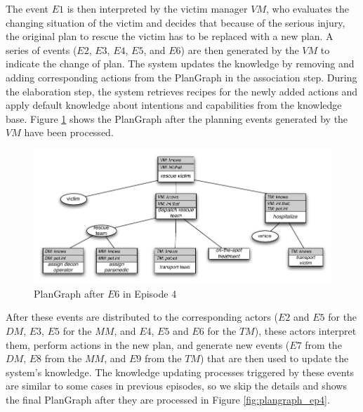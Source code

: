 The event $E1$ is then interpreted by the victim manager $VM$, who evaluates the changing situation of the victim and decides that because of the serious injury, the original plan to rescue the victim has to be replaced with a new plan. A series of events ($E2$, $E3$, $E4$, $E5$, and $E6$) are then generated by the $VM$ to indicate the change of plan. The system updates the knowledge by removing and adding corresponding actions from the PlanGraph in the association step. During the elaboration step, the system retrieves recipes for the newly added actions and apply default knowledge about intentions and capabilities from the knowledge base. Figure \ref{fig:plangraph_ep4_e6} shows the PlanGraph after the planning events generated by the $VM$ have been processed.

\begin{figure}[htbp] %
	\centering
	\includegraphics{plangraph_ep4_e6.pdf} 
	\caption{PlanGraph after $E6$ in Episode 4}
	\label{fig:plangraph_ep4_e6}
\end{figure}

After these events are distributed to the corresponding actors ($E2$ and $E5$ for the $DM$, $E3$, $E5$ for the $MM$, and $E4$, $E5$ and $E6$ for the $TM$), these actors interpret them, perform actions in the new plan, and generate new events ($E7$ from the $DM$, $E8$ from the $MM$, and $E9$ from the $TM$) that are then used to update the system's knowledge. The knowledge updating processes triggered by these events are similar to some cases in previous episodes, so we skip the details and shows the final PlanGraph after they are processed in Figure \ref{fig:plangraph_ep4}.

